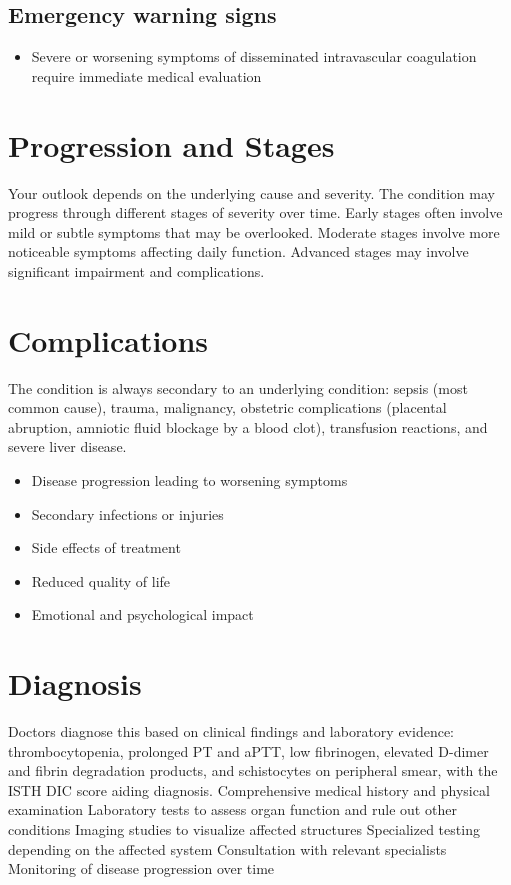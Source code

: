 \subsection{Emergency warning signs}
\begin{itemize}[noitemsep]
  \item Severe or worsening symptoms of disseminated intravascular coagulation require immediate medical evaluation
\end{itemize}
\section{Progression and Stages}
Your outlook depends on the underlying cause and severity. The condition may progress through different stages of severity over time. Early stages often involve mild or subtle symptoms that may be overlooked. Moderate stages involve more noticeable symptoms affecting daily function. Advanced stages may involve significant impairment and complications.
\section{Complications}
The condition is always secondary to an underlying condition: sepsis (most common cause), trauma, malignancy, obstetric complications (placental abruption, amniotic fluid blockage by a blood clot), transfusion reactions, and severe liver disease.

\begin{itemize}[noitemsep]
  \item Disease progression leading to worsening symptoms
  \item Secondary infections or injuries
  \item Side effects of treatment
  \item Reduced quality of life
  \item Emotional and psychological impact
\end{itemize}
\section{Diagnosis}
Doctors diagnose this based on clinical findings and laboratory evidence: thrombocytopenia, prolonged PT and aPTT, low fibrinogen, elevated D-dimer and fibrin degradation products, and schistocytes on peripheral smear, with the ISTH DIC score aiding diagnosis. Comprehensive medical history and physical examination Laboratory tests to assess organ function and rule out other conditions Imaging studies to visualize affected structures Specialized testing depending on the affected system Consultation with relevant specialists Monitoring of disease progression over time

